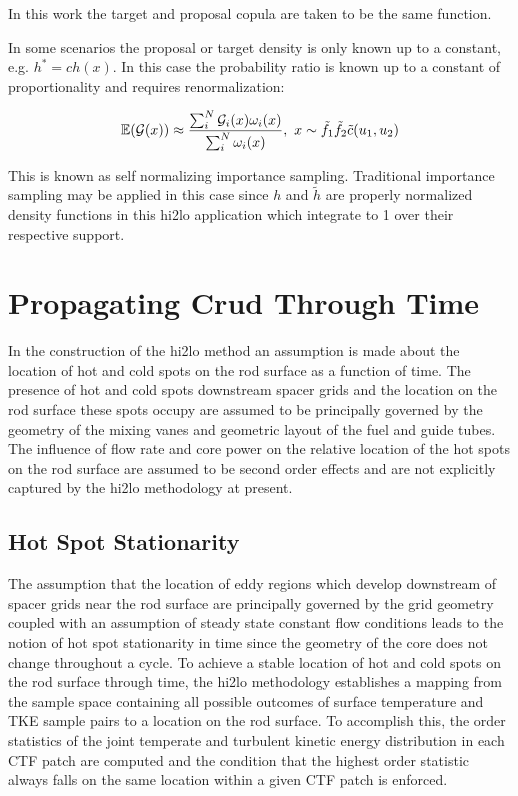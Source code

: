 In this work the target and proposal copula are taken to be the same function.

In some scenarios the proposal or target density is only known up to a constant, e.g. $h^* = c h(x)$.  In this case the probability ratio is known up to a constant of proportionality and requires renormalization: 

\begin{equation}
\operatorname*{\mathbb{E}}(\mathcal G(x)) \approx \frac{ \sum_i^N \mathcal G_i(x) \omega_i(x)}{\sum_i^N \omega_i(x)}
,
 \ x \sim \tilde{f_1} \tilde f_2 \tilde c(u_1, u_2)
\end{equation}

This is known as self normalizing importance sampling.  Traditional importance sampling may be applied in this case since $h$ and $\tilde{h}$ are properly normalized density functions in this hi2lo application which integrate to 1 over their respective support.


\section{Propagating Crud Through Time}

In the construction of the hi2lo method an assumption is made about the location of hot and cold spots on the rod surface as a function of time.   The presence of hot and cold spots downstream spacer grids and the location on the rod surface these spots occupy are assumed to be principally governed by the geometry of the mixing vanes and geometric layout of the fuel and guide tubes.  The influence of flow rate and core power on the relative location of the hot spots on the rod surface are assumed to be second order effects and are not explicitly captured by the hi2lo methodology at present.

\subsection{Hot Spot Stationarity}
\label{sec:hot_spot_stat}

The assumption that the location of eddy regions which develop downstream of spacer grids near the rod surface are principally governed by the grid geometry coupled with an assumption of steady state constant flow conditions leads to the notion of hot spot stationarity in time since the geometry of the core does not change throughout a cycle.  To achieve a stable location of hot and cold spots on the rod surface through time, the hi2lo methodology establishes a mapping from the sample space containing all possible outcomes of surface temperature and TKE sample pairs to a location on the rod surface.  To accomplish this, the order statistics of the joint temperate and turbulent kinetic energy distribution in each CTF patch are computed and the condition that the highest order statistic always falls on the same location within a given CTF patch is enforced.

